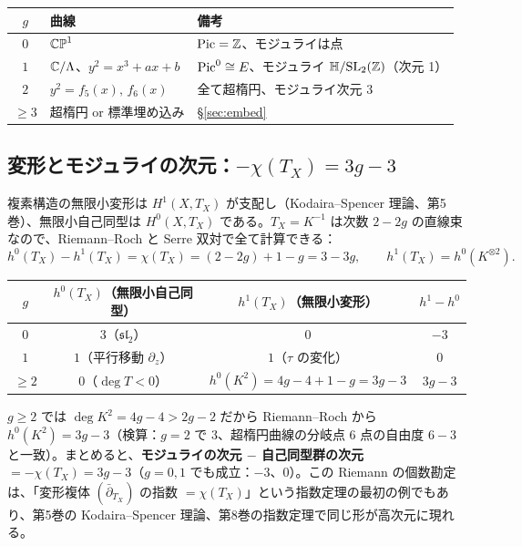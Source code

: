 \begin{center}
\begin{tabular}{c|l|l}
\toprule
$g$ & 曲線 & 備考\\
\midrule
$0$ & $\mathbb{CP}^1$ & $\mathrm{Pic}=\mathbb Z$、モジュライは点\\
$1$ & $\mathbb C/\Lambda$、$y^2=x^3+ax+b$ & $\mathrm{Pic}^0\cong E$、モジュライ $\mathbb H/\mathrm{SL}_2(\mathbb Z)$（次元 1）\\
$2$ & $y^2=f_5(x),\,f_6(x)$ & 全て超楕円、モジュライ次元 $3$\\
$\ge3$ & 超楕円 or 標準埋め込み & \S\ref{sec:embed}\\
\bottomrule
\end{tabular}
\end{center}

\subsection{変形とモジュライの次元：$-\chi(T_X)=3g-3$}\label{subsec:moduli}
複素構造の無限小変形は $H^1(X,T_X)$ が支配し（Kodaira--Spencer 理論、第5巻）、無限小自己同型は $H^0(X,T_X)$ である。$T_X=K^{-1}$ は次数 $2-2g$ の直線束なので、Riemann--Roch と Serre 双対で全て計算できる：
\[
h^0(T_X)-h^1(T_X)=\chi(T_X)=(2-2g)+1-g=3-3g,\qquad h^1(T_X)=h^0(K^{\otimes2}).
\]
\begin{center}
\begin{tabular}{c|c|c|c}
\toprule
$g$ & $h^0(T_X)$（無限小自己同型） & $h^1(T_X)$（無限小変形） & $h^1-h^0$\\
\midrule
$0$ & $3$（$\mathfrak{sl}_2$） & $0$ & $-3$\\
$1$ & $1$（平行移動 $\partial_z$） & $1$（$\tau$ の変化） & $0$\\
$\ge2$ & $0$（$\deg T<0$） & $h^0(K^2)=4g-4+1-g=3g-3$ & $3g-3$\\
\bottomrule
\end{tabular}
\end{center}
$g\ge2$ では $\deg K^2=4g-4>2g-2$ だから Riemann--Roch から $h^0(K^2)=3g-3$（検算：$g=2$ で $3$、超楕円曲線の分岐点 6 点の自由度 $6-3$ と一致）。まとめると、\textbf{モジュライの次元 $-$ 自己同型群の次元 $=-\chi(T_X)=3g-3$}（$g=0,1$ でも成立：$-3$、$0$）。この Riemann の個数勘定は、「変形複体 $(\bar\partial_{T_X})$ の指数 $=\chi(T_X)$」という指数定理の最初の例でもあり、第5巻の Kodaira--Spencer 理論、第8巻の指数定理で同じ形が高次元に現れる。

